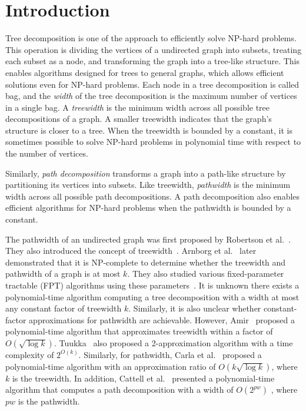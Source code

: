 \documentclass[runningheads]{llncs}
\theoremstyle{plain}
\theoremstyle{definition}
\begin{document}
\section{Introduction}

Tree decomposition is one of the approach to efficiently solve NP-hard problems. This operation is dividing the vertices of a undirected graph into subsets, treating each subset as a node, and transforming the graph into a tree-like structure. This enables algorithms designed for trees to general graphs, which allows efficient solutions even for NP-hard problems. Each node in a tree decomposition is called bag, and the \emph{width} of the tree decomposition is the maximum number of vertices in a single bag. A \emph{treewidth} is the minimum width across all possible tree decompositions of a graph. A smaller treewidth indicates that the graph's structure is closer to a tree. When the treewidth is bounded by a constant, it is sometimes possible to solve NP-hard problems in polynomial time with respect to the number of vertices.

Similarly, \emph{path decomposition} transforms a graph into a path-like structure by partitioning its vertices into subsets. Like treewidth, \emph{pathwidth} is the minimum width across all possible path decompositions. A path decomposition also enables efficient algorithms for NP-hard problems when the pathwidth is bounded by a constant.

The pathwidth of an undirected graph was first proposed by Robertson et al.~\cite{art1}. They also introduced the concept of treewidth~\cite{art2}. Arnborg et al.~\cite{art3} later demonstrated that it is NP-complete to determine whether the treewidth and pathwidth of a graph is at most \(k\). They also studied various fixed-parameter tractable (FPT) algorithms using these parameters~\cite{art4}. It is unknown there exists a polynomial-time algorithm computing a tree decomposition with a width at most any constant factor of treewidth $k$. Similarly, it is also unclear whether constant-factor approximations for pathwidth are achievable. However, Amir~\cite{art5} proposed a polynomial-time algorithm that approximates treewidth within a factor of $O(\sqrt{\log k})$. Tuukka~\cite{art6} also proposed a 2-approximation algorithm with a time complexity of $2^{O(k)}$. Similarly, for pathwidth, Carla et al.~\cite{art7} proposed a polynomial-time algorithm with an approximation ratio of $O(k\sqrt{\log k})$, where \( k \) is the treewidth. In addition, Cattell et al.~\cite{art8} presented a polynomial-time algorithm that computes a path decomposition with a width of $O(2^{pw})$ , where $pw$ is the pathwidth.
\end{document}
